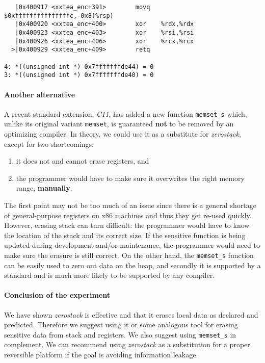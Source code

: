 \documentclass[a4paper,10pt,openright]{memoir}
\newcommand{\term}[1]{\textit{#1}}
\newcommand{\code}[1]{\texttt{#1}}
\begin{document}
\begin{verbatim}
   |0x400917 <xxtea_enc+391>        movq   $0xfffffffffffffffc,-0x8(%rsp)
   |0x400920 <xxtea_enc+400>        xor    %rdx,%rdx                     
   |0x400923 <xxtea_enc+403>        xor    %rsi,%rsi                     
   |0x400926 <xxtea_enc+406>        xor    %rcx,%rcx                     
  >|0x400929 <xxtea_enc+409>        retq 

4: *((unsigned int *) 0x7fffffffde44) = 0
3: *((unsigned int *) 0x7fffffffde40) = 0
\end{verbatim}

\paragraph{Another alternative}

A recent standard extension, \term{C11}, has added a new function 
\code{memset\_s} which, unlike its original variant \code{memset}, is 
guaranteed \textbf{not} to be removed by an optimizing compiler. In 
theory, we could use it as a substitute for \term{zerostack}, except 
for two shortcomings:

\begin{enumerate}
\item it does not and cannot erase registers, and
\item the programmer would have to make sure it overwrites the right memory range, \textbf{manually}.
\end{enumerate}

The first point may not be too much of an issue since there is a 
general shortage of general-purpose registers on x86 machines and thus 
they get re-used quickly. However, erasing stack can turn difficult: 
the programmer would have to know the location of the stack and its 
correct size. If the sensitive function is being updated during 
development and/or maintenance, the programmer would need to make sure 
the erasure is still correct. On the other hand, the \code{memset\_s} 
function can be easily used to zero out data on the heap, and secondly 
it is supported by a standard and is much more likely to be supported 
by any compiler.

\paragraph{Conclusion of the experiment}

We have shown \term{zerostack} is effective and that it erases local 
data as declared and predicted. Therefore we suggest using it or some 
analogous tool for erasing sensitive data from stack and registers. We 
also suggest using \code{memset\_s} in complement. We can recommend 
using \term{zerostack} as a substitution for a proper reversible 
platform if the goal is avoiding information leakage.
\end{document}

